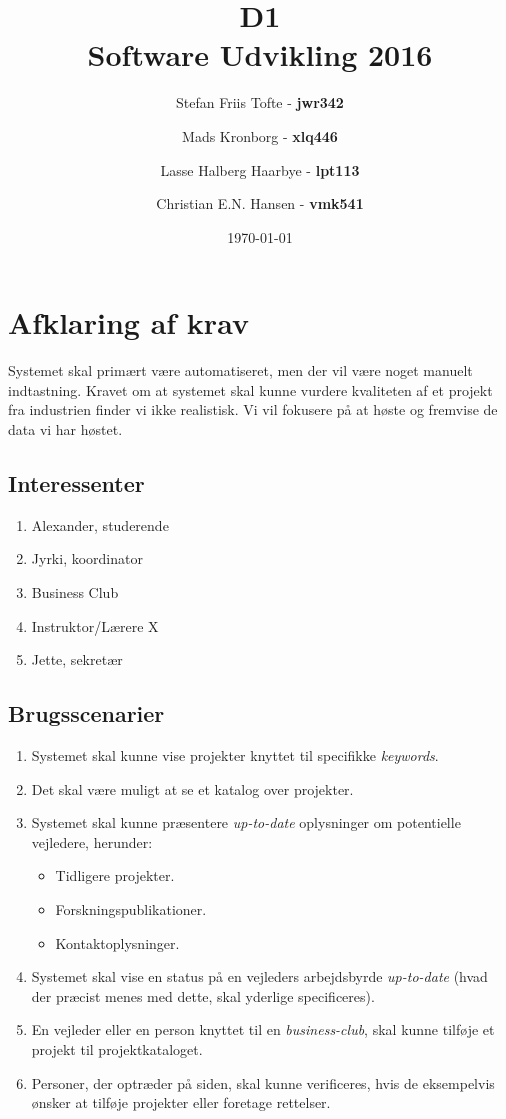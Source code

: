 \documentclass[11pt]{article}
\title{
  \vspace{3cm}
  \Huge{D1} \\
  \Large{Software Udvikling 2016}
}
\author{
	\Large{Stefan Friis Tofte} - \textbf{jwr342}%
	\and
	\Large{Mads Kronborg} - \textbf{xlq446}%
	\and
	\Large{Lasse Halberg Haarbye} - \textbf{lpt113}%
	\and
	\Large{Christian E.N. Hansen} - \textbf{vmk541}%
}
\date{
    \today
}
\def \ColourPDF {../include/ku-farve}
\def \TitlePDF {../include/ku-en}  %
\begin{document}


\clearpage\maketitle
\thispagestyle{empty}

\newpage
\tableofcontents
\newpage
\section{Afklaring af krav}
Systemet skal primært være automatiseret, men der vil være noget manuelt indtastning. Kravet om at systemet skal kunne vurdere kvaliteten af et projekt fra industrien finder vi ikke realistisk. Vi vil fokusere på at høste og fremvise de data vi har høstet.


\subsection{Interessenter}
\begin{enumerate}
\item Alexander, studerende
\item Jyrki, koordinator
\item Business Club
\item Instruktor/Lærere X
\item Jette, sekretær
\end{enumerate}
\subsection{Brugsscenarier}

\begin{enumerate}
  \item Systemet skal kunne vise projekter knyttet til specifikke \textit{keywords}.
  \item Det skal være muligt at se et katalog over projekter.
  \item Systemet skal kunne præsentere \textit{up-to-date} oplysninger om potentielle vejledere, herunder:
  \begin{itemize}
    \item Tidligere projekter.
    \item Forskningspublikationer.
    \item Kontaktoplysninger.
  \end{itemize}
  \item Systemet skal vise en status på en vejleders arbejdsbyrde \textit{up-to-date} (hvad der præcist menes med dette, skal yderlige specificeres).
  \item En vejleder eller en person knyttet til en \textit{business-club}, skal kunne tilføje et projekt til projektkataloget.
  \item Personer, der optræder på siden, skal kunne verificeres, hvis de eksempelvis ønsker at tilføje projekter eller foretage rettelser.
\end{enumerate}
\end{document}
